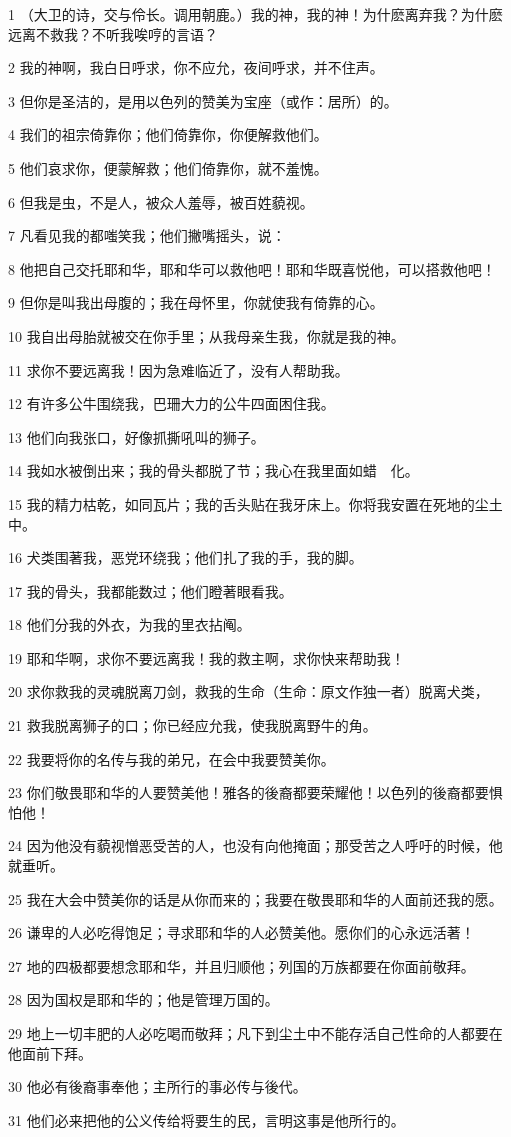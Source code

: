 \par 1 （大卫的诗，交与伶长。调用朝鹿。）我的神，我的神！为什麽离弃我？为什麽远离不救我？不听我唉哼的言语？
\par 2 我的神啊，我白日呼求，你不应允，夜间呼求，并不住声。
\par 3 但你是圣洁的，是用以色列的赞美为宝座（或作：居所）的。
\par 4 我们的祖宗倚靠你；他们倚靠你，你便解救他们。
\par 5 他们哀求你，便蒙解救；他们倚靠你，就不羞愧。
\par 6 但我是虫，不是人，被众人羞辱，被百姓藐视。
\par 7 凡看见我的都嗤笑我；他们撇嘴摇头，说：
\par 8 他把自己交托耶和华，耶和华可以救他吧！耶和华既喜悦他，可以搭救他吧！
\par 9 但你是叫我出母腹的；我在母怀里，你就使我有倚靠的心。
\par 10 我自出母胎就被交在你手里；从我母亲生我，你就是我的神。
\par 11 求你不要远离我！因为急难临近了，没有人帮助我。
\par 12 有许多公牛围绕我，巴珊大力的公牛四面困住我。
\par 13 他们向我张口，好像抓撕吼叫的狮子。
\par 14 我如水被倒出来；我的骨头都脱了节；我心在我里面如蜡　化。
\par 15 我的精力枯乾，如同瓦片；我的舌头贴在我牙床上。你将我安置在死地的尘土中。
\par 16 犬类围著我，恶党环绕我；他们扎了我的手，我的脚。
\par 17 我的骨头，我都能数过；他们瞪著眼看我。
\par 18 他们分我的外衣，为我的里衣拈阄。
\par 19 耶和华啊，求你不要远离我！我的救主啊，求你快来帮助我！
\par 20 求你救我的灵魂脱离刀剑，救我的生命（生命：原文作独一者）脱离犬类，
\par 21 救我脱离狮子的口；你已经应允我，使我脱离野牛的角。
\par 22 我要将你的名传与我的弟兄，在会中我要赞美你。
\par 23 你们敬畏耶和华的人要赞美他！雅各的後裔都要荣耀他！以色列的後裔都要惧怕他！
\par 24 因为他没有藐视憎恶受苦的人，也没有向他掩面；那受苦之人呼吁的时候，他就垂听。
\par 25 我在大会中赞美你的话是从你而来的；我要在敬畏耶和华的人面前还我的愿。
\par 26 谦卑的人必吃得饱足；寻求耶和华的人必赞美他。愿你们的心永远活著！
\par 27 地的四极都要想念耶和华，并且归顺他；列国的万族都要在你面前敬拜。
\par 28 因为国权是耶和华的；他是管理万国的。
\par 29 地上一切丰肥的人必吃喝而敬拜；凡下到尘土中不能存活自己性命的人都要在他面前下拜。
\par 30 他必有後裔事奉他；主所行的事必传与後代。
\par 31 他们必来把他的公义传给将要生的民，言明这事是他所行的。

